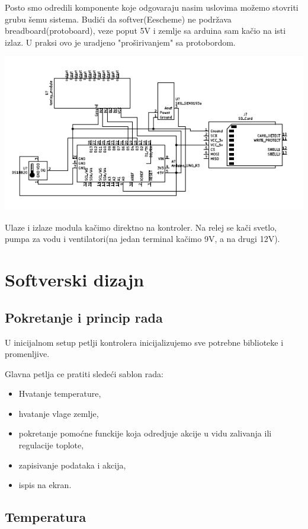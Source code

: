 \documentclass[a4paper,11pt]{book}
\begin{document}
Posto smo odredili komponente koje odgovaraju nasim uslovima možemo stovriti grubu šemu sistema. Budići da softver(Eescheme) ne podržava breadboard(protoboard), veze poput 5V i zemlje sa arduina sam kačio na isti izlaz. U praksi ovo je uradjeno "proširivanjem" sa protobordom.

\includegraphics[width=\textwidth]{kontroler.png}

Ulaze i izlaze modula kačimo direktno na kontroler. Na relej se kači svetlo, pumpa za vodu i ventilatori(na jedan terminal kačimo 9V, a na drugi 12V).

\section{Softverski dizajn}

\subsection{Pokretanje i princip rada}

U inicijalnom setup petlji kontrolera inicijalizujemo sve potrebne biblioteke i promenljive. 

Glavna petlja ce pratiti sledeći sablon rada:

\hrulefill
\begin{itemize}
  \item Hvatanje temperature,
  \item hvatanje vlage zemlje,
  \item pokretanje pomoćne funckije koja odredjuje akcije u vidu zalivanja ili regulacije toplote,
  \item zapisivanje podataka i akcija,
  \item ispis na ekran.
\end{itemize}
\hrulefill

\subsection{Temperatura}
\end{document}
